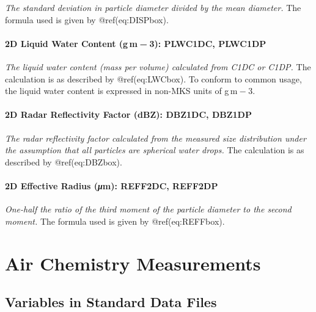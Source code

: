 \documentclass[
  english,
]{book}
\begin{document}
\emph{The standard deviation in particle diameter divided by the mean
diameter.} The formula used is given by @ref(eq:DISPbox).

\hypertarget{lwc2d}{%
\subsubsection*{\texorpdfstring{2D Liquid Water Content (g m{ − 3}):
PLWC1DC,
PLWC1DP}{2D Liquid Water Content (g m − 3): PLWC1DC, PLWC1DP}}\label{lwc2d}}

\emph{The liquid water content (mass per volume) calculated from C1DC or
C1DP.} The calculation is as described by @ref(eq:LWCbox). To conform to
common usage, the liquid water content is expressed in non-MKS units of
g m{ − 3}.

\hypertarget{dbz2d}{%
\subsubsection*{2D Radar Reflectivity Factor (dBZ): DBZ1DC,
DBZ1DP}\label{dbz2d}}

\emph{The radar reflectivity factor calculated from the measured size
distribution under the assumption that all particles are spherical water
drops.} The calculation is as described by @ref(eq:DBZbox).

\hypertarget{reff2d}{%
\subsubsection*{\texorpdfstring{2D Effective Radius ({\emph{μ}}m):
REFF2DC,
REFF2DP}{2D Effective Radius (μm): REFF2DC, REFF2DP}}\label{reff2d}}

\emph{One-half the ratio of the third moment of the particle diameter to
the second moment.} The formula used is given by @ref(eq:REFFbox).

\hypertarget{air-chemistry-measurements}{%
\chapter{Air Chemistry Measurements}\label{air-chemistry-measurements}}

\hypertarget{variables-in-standard-data-files}{%
\section{Variables in Standard Data
Files}\label{variables-in-standard-data-files}}
\end{document}
